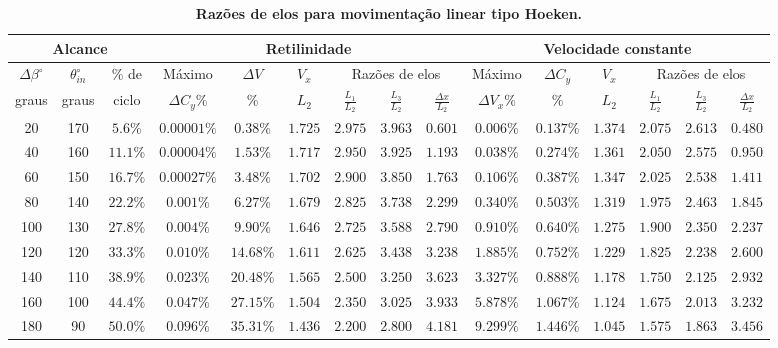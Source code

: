     \begin{table}[H]
        \setlength{\tabcolsep}{3pt}
        \begin{center}
            \caption{\textbf{Razões de elos para movimentação linear tipo Hoeken.}}
            {\fontsize{9}{12}\selectfont
            \begin{tabular}{ccc|cccccc|cccccc}
                \hline
                \multicolumn{3}{c|}{Alcance} & \multicolumn{6}{c|}{Retilinidade} & \multicolumn{6}{c}{Velocidade constante}\\
                \hline
                $\Delta\beta^\circ$ & $\theta_{in}^\circ$ & \% de & Máximo & $\Delta V$ & $V_x$ & \multicolumn{3}{c|}{Razões de elos} &  Máximo & $\Delta C_y$ & $V_x$ & \multicolumn{3}{c}{Razões de elos}\\
                graus & graus & ciclo & $\Delta C_y \%$ & $\%$ & $L_2$ & $\frac{L_1}{L_2}$ & $\frac{L_3}{L_2}$ &  $\frac{\Delta x}{L_2}$ & $\Delta V_x \%$ & $\%$ & $L_2$ & $\frac{L_1}{L_2}$ & $\frac{L_3}{L_2}$ &  $\frac{\Delta x}{L_2}$\\
                \hline
                20 & 170 & $5.6 \%$ & $0.00001 \%$ & $0.38 \%$& $1.725$& $2.975$& $3.963$& $0.601$& $0.006 \%$& $0.137 \%$& $1.374$& $2.075$&$2.613$&$0.480$\\
                40 & 160 & $11.1 \%$ & $0.00004 \%$ & $1.53 \%$ & $1.717$& $2.950$& $3.925$& $1.193$& $0.038 \%$& $0.274 \%$& $1.361$& $2.050$&$2.575$&$0.950$\\
                60 & 150 & $16.7 \%$ & $0.00027 \%$ & $3.48 \%$& $1.702$& $2.900$& $3.850$& $1.763$& $0.106 \%$& $0.387 \%$& $1.347$& $2.025$&$2.538$&$1.411$\\
                80 & 140 & $22.2 \%$ & $0.001 \%$ & $6.27 \%$& $1.679$& $2.825$& $3.738$& $2.299$& $0.340 \%$& $0.503 \%$& $1.319$& $1.975$&$2.463$&$1.845$\\
                100 & 130 & $27.8 \%$ & $0.004 \%$ & $9.90 \%$& $1.646$& $2.725$& $3.588$& $2.790$& $0.910 \%$& $0.640 \%$& $1.275$& $1.900$&$2.350$&$2.237$\\
                120 & 120 & $33.3 \%$ & $0.010 \%$ & $14.68 \%$& $1.611$& $2.625$& $3.438$& $3.238$& $1.885 \%$& $0.752 \%$& $1.229$& $1.825$&$2.238$&$2.600$\\
                140 & 110 & $38.9 \%$ & $0.023 \%$ & $20.48 \%$& $1.565$& $2.500$& $3.250$& $3.623$& $3.327 \%$& $0.888 \%$& $1.178$& $1.750$&$2.125$&$2.932$\\
                160 & 100 & $44.4 \%$ & $0.047 \%$ & $27.15 \%$& $1.504$& $2.350$& $3.025$& $3.933$& $5.878 \%$& $1.067 \%$& $1.124$& $1.675$&$2.013$&$3.232$\\
                180 & 90 & $50.0 \%$ & $0.096 \%$ & $35.31 \%$& $1.436$& $2.200$& $2.800$& $4.181$& $9.299 \%$& $1.446 \%$& $1.045$& $1.575$&$1.863$&$3.456$\\
                \hline
            \end{tabular}}\label{tab1}\hspace{.7cm}
        \end{center}
    \end{table}

